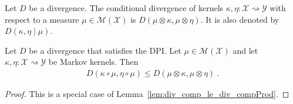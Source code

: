 \begin{definition}
  \label{def:condDiv}
  Let $D$ be a divergence.
  The conditional divergence of kernels $\kappa, \eta : \mathcal X \rightsquigarrow \mathcal Y$ with respect to a measure $\mu \in \mathcal M(\mathcal X)$ is $D(\mu \otimes \kappa, \mu \otimes \eta)$. It is also denoted by $D(\kappa, \eta \mid \mu)$.
\end{definition}


\begin{lemma}
  \label{lem:div_comp_le_div_compProd_right}
  Let $D$ be a divergence that satisfies the DPI. Let $\mathcal \mu \in \mathcal M(\mathcal X)$ and let $\kappa, \eta : \mathcal X \rightsquigarrow \mathcal Y$ be Markov kernels. Then
  \begin{align*}
  D(\kappa \circ \mu, \eta \circ \mu) \le D(\mu \otimes \kappa, \mu \otimes \eta) \: .
  \end{align*}
\end{lemma}

\begin{proof}%
{}
This is a special case of Lemma~\ref{lem:div_comp_le_div_compProd}.
\end{proof}